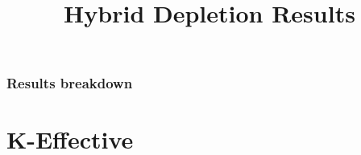\documentclass[
	11pt, %
	aspectratio=169, %
]{beamer}
\title{Hybrid Depletion Results} %
\begin{document}

\begin{frame}
	\titlepage %
\end{frame}



\begin{frame}
	\frametitle{Results breakdown} %

	\tableofcontents %
\end{frame}


\section{K-Effective} %
\end{document}
